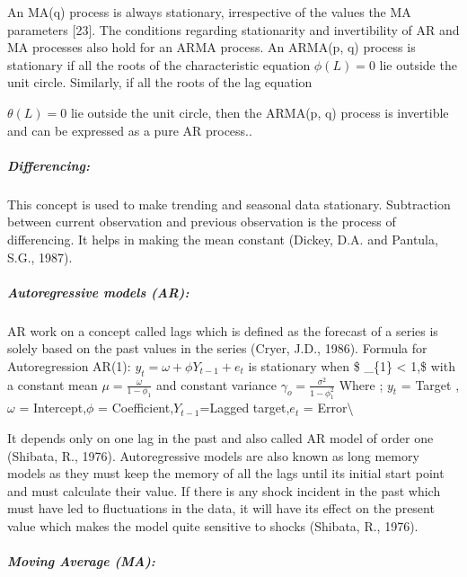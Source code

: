 \documentclass[
  letterpaper,
  DIV=11,
  numbers=noendperiod]{scrartcl}
\let\oldsubparagraph\subparagraph
\renewcommand{\subparagraph}[1]{\oldsubparagraph{#1}\mbox{}}
\begin{document}
An MA(q) process is always stationary, irrespective of the values the MA
parameters {[}23{]}. The conditions regarding stationarity and
invertibility of AR and MA processes also hold for an ARMA process. An
ARMA(p, q) process is stationary if all the roots of the characteristic
equation \(\phi (L) = 0\) lie outside the unit circle. Similarly, if all
the roots of the lag equation

\(\theta (L) = 0\) lie outside the unit circle, then the ARMA(p, q)
process is invertible and can be expressed as a pure AR process..

\hypertarget{differencing}{%
\subparagraph{\texorpdfstring{\textbf{Differencing:}}{Differencing:}}\label{differencing}}

This concept is used to make trending and seasonal data stationary.
Subtraction between current observation and previous observation is the
process of differencing. It helps in making the mean constant (Dickey,
D.A. and Pantula, S.G., 1987).

\hypertarget{autoregressive-models-ar}{%
\subparagraph{\texorpdfstring{\textbf{Autoregressive models
(AR):}}{Autoregressive models (AR):}}\label{autoregressive-models-ar}}

AR work on a concept called lags which is defined as the forecast of a
series is solely based on the past values in the series (Cryer, J.D.,
1986). Formula for Autoregression AR(1):
\(\displaystyle y_{t} = \omega + \phi Y _{t-1}+ e_{t}\) is stationary
when \$ \textbar{}\phi\_\{1\}\textbar{} \textless{} 1,\$ with a constant
mean \(\displaystyle \mu = \frac{\omega}{1-\phi_{1}}\) and constant
variance
\(\displaystyle \gamma_{o} = \frac{\sigma^{2}}{1-\phi_{1}^{2}}\) Where ;
\quad    \(y_{t}\) = Target ,\quad \(\omega\) = Intercept,\quad \(\phi\)
= Coefficient,\quad \(Y_{t-1}\)=Lagged target,\quad \(e_{t}\) =
Error\textbackslash{}

It depends only on one lag in the past and also called AR model of order
one (Shibata, R., 1976). Autoregressive models are also known as long
memory models as they must keep the memory of all the lags until its
initial start point and must calculate their value. If there is any
shock incident in the past which must have led to fluctuations in the
data, it will have its effect on the present value which makes the model
quite sensitive to shocks (Shibata, R., 1976).

\hypertarget{moving-average-ma}{%
\subparagraph{\texorpdfstring{\textbf{Moving Average
(MA):}}{Moving Average (MA):}}\label{moving-average-ma}}
\end{document}
